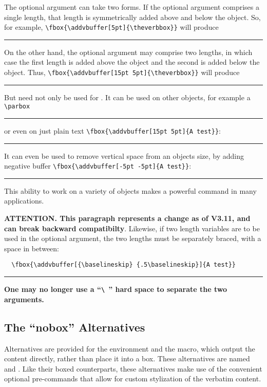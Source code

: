 \documentclass{article}
\newcommand\rl{\rule{1em}{0in}}
\newcommand\margenv[1]{\marginpar{\hfill\ttfamily#1}}
\begin{document}
\begin{myverbbox}{\myvb}
The optional argument can take two forms.  If the optional argument
comprises a single length, that length is symmetrically added above and
below the object.  So, for example,
  \verb|\fbox{\addvbuffer[5pt]{\theverbbox}}|
will produce

\rl\fbox{\addvbuffer[5pt]{\theverbbox}}

On the other hand, the optional argument may comprise two lengths, in
which case the first length is added above the object and the second is
added below the object.  Thus, 
\verb|\fbox{\addvbuffer[15pt 5pt]{\theverbbox}}|
will produce

\rl\fbox{\addvbuffer[15pt 5pt]{\theverbbox}}

But {\avb} need not only be used for \tvb.  It can be used on other
objects, for example a \verb|\parbox|

\rl{}

or even on just plain text \verb|\fbox{\addvbuffer[15pt 5pt]{A test}}|:

\rl{}

It can even be used to remove vertical space from an objects size, by
adding negative buffer \verb|\fbox{\addvbuffer[-5pt -5pt]{A test}}|:

\rl{}

This ability to work on a variety of objects makes {\avb} a powerful
command in many applications.

\textbf{ATTENTION.  This paragraph represents a change as of V3.11, and 
can break backward compatibilty}.
Likewise, if two length variables are to be used in the optional
argument, the two lengths must be separately braced, with a space in between:

\begin{verbatim}
  \fbox{\addvbuffer[{\baselineskip} {.5\baselineskip}]{A test}}
\end{verbatim}

\rl{}

{\bfseries One may no longer use a ``\verb|\ |'' hard space to separate the
two arguments.}

\subsection{The ``nobox'' Alternatives}

Alternatives are provided for the {\vrbox} environment and the {\vbfbox}
macro, which output the content directly, rather than place it into a
box.  These alternatives are named {\vrnobox}\margenv{\vrnobox} and
{\vbfnobox}\margenv{\vbfnobox}.  Like their boxed counterparts, these
alternatives make use of the convenient optional pre-commands that allow
for custom stylization of the verbatim content.  


\end{myverbbox}
\end{document}
